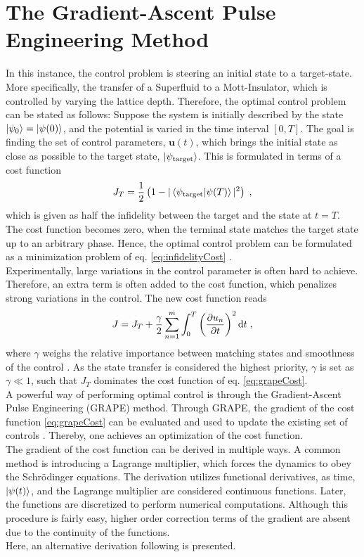 \section{The Gradient-Ascent Pulse Engineering Method}
In this instance, the control problem is steering an initial state to a target-state. More specifically, the transfer of a Superfluid to a Mott-Insulator, which is controlled by varying the lattice depth. Therefore, the optimal control problem can be stated as follows: 
Suppose the system is initially described by the state $\ket{\psi_0} = \ket{\psi (0)}$, and the potential is varied in the time interval $[ 0 , T]$. The goal is finding the set of control parameters, $\boldsymbol{u}(t)$, which brings the initial state as close as possible to the target state, $\ket{\psi_{\mathrm{target}}}$. This is formulated in terms of a cost function
\begin{equation}
	J_T = \frac{1}{2} \left( 1-|\braket{\psi_{\mathrm{target}} | \psi (T)}|^2 \right) \; ,
	\label{eq:infidelityCost}
\end{equation}
which is given as half the infidelity between the target and the state at $t=T$. The cost function becomes zero, when the terminal state matches the target state up to an arbitrary phase. Hence, the optimal control problem can be formulated as a minimization problem of eq. \eqref{eq:infidelityCost} \cite{Jager2014}.\\
Experimentally, large variations in the control parameter is often hard to achieve. Therefore, an extra term is often added to the cost function, which penalizes strong variations in the control. The new cost function reads
\begin{equation}
	J = J_T + \frac{\gamma}{2} \sum_{n=1}^{m} \int_{0}^{T} \left( \pdv{u_n}{t} \right)^2 \mathrm{d}t \; ,
	\label{eq:grapeCost}
\end{equation}
where $\gamma$ weighs the relative importance between matching states and smoothness of the control \cite{Jager2014}. As the state transfer is considered the highest priority, $\gamma$ is set as $\gamma \ll 1$, such that $J_T$ dominates the cost function of eq. \eqref{eq:grapeCost}.\\

A powerful way of performing optimal control is through the Gradient-Ascent Pulse Engineering (GRAPE) method. Through GRAPE, the gradient of the cost function \eqref{eq:grapeCost} can be evaluated and used to update the existing set of controls \cite{Khaneja2005}. Thereby, one achieves an optimization of the cost function.\\
The gradient of the cost function can be derived in multiple ways. A common method \cite{Hohenester2007, Winckel2008, BECcontrol} is introducing a Lagrange multiplier, which forces the dynamics to obey the Schrödinger equations. The derivation utilizes functional derivatives, as time, $\ket{\psi (t)}$, and the Lagrange multiplier are considered continuous functions. Later, the functions are discretized to perform numerical computations. Although this procedure is fairly easy, higher order correction terms of the gradient are absent due to the continuity of the functions.\\
Here, an alternative derivation following \cite{Khaneja2005, deFouquieres2011} is presented.

